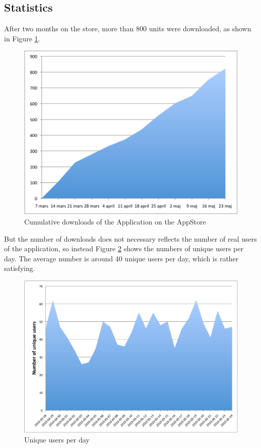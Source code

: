 \subsection{Statistics}
After two months on the store, more than 800 units were downloaded, as shown in Figure \ref{fig:cumulative_downloads}.\\

\begin{figure}[ht]
\center
\includegraphics[scale=0.5]{pics/cumulative_downloads}
\caption{Cumulative downloads of the Application on the AppStore}
\label{fig:cumulative_downloads}
\end{figure}

But the number of downloads does not necessary reflects the number of real users of the application, so instead Figure \ref{fig:unique_users} shows the numbers of unique users per day. The average number is around 40 unique users per day, which is rather satisfying.\\

\begin{figure}[ht]
\center
\includegraphics[scale=0.35]{pics/unique_users}
\caption{Unique users per day}
\label{fig:unique_users}
\end{figure}

